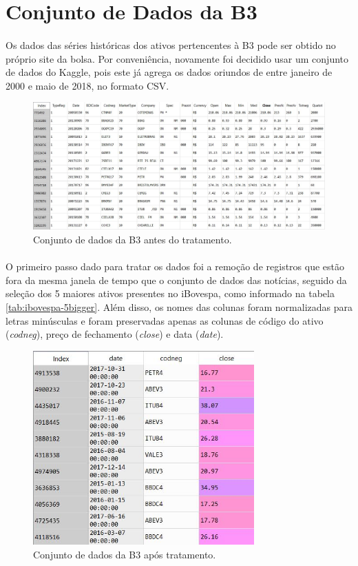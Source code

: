 \documentclass[grad,numbers]{coppe}
\begin{document}
  	\section{Conjunto de Dados da B3}
  		\paragraph{}Os dados das séries históricas dos ativos pertencentes à B3 pode ser obtido no próprio site da bolsa\cite{b3-serie-historica}. Por conveniência, novamente foi decidido usar um conjunto de dados do Kaggle\cite{b3-dataset}, pois este já agrega os dados oriundos de \cite{b3-serie-historica} entre janeiro de 2000 e maio de 2018, no formato CSV.
			\begin{figure}[h]
				\centering
				{\includegraphics[width=13cm]{b3-dataset}
					\caption{Conjunto de dados da B3 antes do tratamento.}
					\label{fig:b3-dataset-fig}}
			\end{figure}
  		\paragraph{}O primeiro passo dado para tratar os dados foi a remoção de registros que estão fora da mesma janela de tempo que o conjunto de dados das notícias, seguido da seleção dos 5 maiores ativos presentes no iBovespa, como informado na tabela \ref{tab:ibovespa-5bigger}. Além disso, os nomes das colunas foram normalizadas para letras minúsculas e foram preservadas apenas as colunas de código do ativo (\textit{codneg}), preço de fechamento (\textit{close}) e data (\textit{date}).
  		\begin{figure}[h]
  			\centering
  			{\includegraphics[width=8.5cm]{b3-pp-dataset}
  				\caption{Conjunto de dados da B3 após tratamento.}
  				\label{fig:b3-pp-dataset-fig}}
  		\end{figure}
\end{document}
